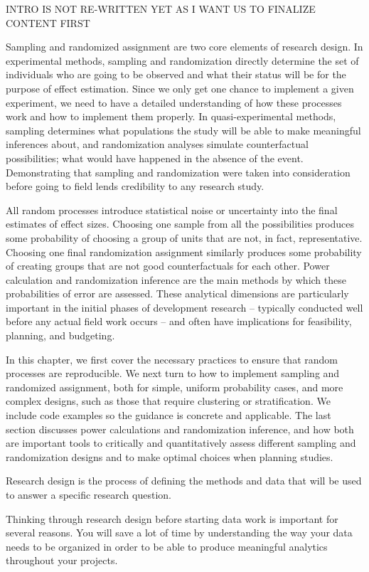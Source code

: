 
\begin{fullwidth}
	
	INTRO IS NOT RE-WRITTEN YET AS I WANT US TO FINALIZE CONTENT FIRST
	
	Sampling and randomized assignment are two core elements of research design.
	In experimental methods, sampling and randomization directly determine
	the set of individuals who are going to be observed
	and what their status will be for the purpose of effect estimation.
	Since we only get one chance to implement a given experiment,
	we need to have a detailed understanding of how these processes work
	and how to implement them properly.
	In quasi-experimental methods, sampling determines what populations the study
	will be able to make meaningful inferences about,
	and randomization analyses simulate counterfactual possibilities;
	what would have happened in the absence of the event.
	Demonstrating that sampling and randomization were taken into consideration
	before going to field lends credibility to any research study.

	All random processes introduce statistical noise
	or uncertainty into the final estimates of effect sizes.
	Choosing one sample from all the possibilities produces some probability of
	choosing a group of units that are not, in fact, representative.
	Choosing one final randomization assignment similarly produces some probability of
	creating groups that are not good counterfactuals for each other.
	Power calculation and randomization inference
	are the main methods by which these probabilities of error are assessed.
	These analytical dimensions are particularly important in the initial phases of development research --
	typically conducted well before any actual field work occurs --
	and often have implications for feasibility, planning, and budgeting.

	In this chapter, we first cover the necessary practices to ensure that random processes are reproducible.
	We next turn to how to implement sampling and randomized assignment,
	both for simple, uniform probability cases, and more complex designs,
	such as those that require clustering or stratification.
	We include code examples so the guidance is concrete and applicable.
	The last section discusses power calculations and randomization inference,
	and how both are important tools to critically and quantitatively assess different
	sampling and randomization designs and to make optimal choices when planning studies.



	Research design is the process of defining the methods and data
	that will be used to answer a specific research question.


	Thinking through research design before starting data work is important for several reasons.
	You will save a lot of time by understanding the way
	your data needs to be organized
	in order to be able to produce meaningful analytics throughout your projects.


\end{fullwidth}

